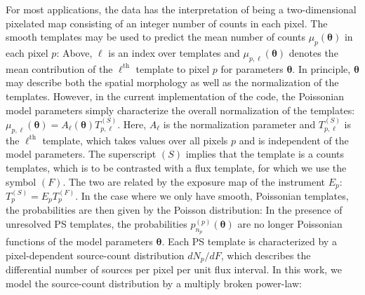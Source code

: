 For most applications, the data has the interpretation of being a two-dimensional pixelated map consisting of an integer number of counts in each pixel.  The smooth templates may be used to predict the mean number of counts $\mu_p({\bm \theta})$ in each pixel $p$:   
Above, $\ell$ is an index over templates and $\mu_{p, \ell} ({\bm \theta})$ denotes the mean contribution of the $\ell^\text{th}$ template to pixel $p$ for parameters ${\bm \theta}$.  In principle, ${\bm \theta}$ may describe both the spatial morphology as well as the normalization of the templates.  However, in the current implementation of the code, the Poissonian model parameters simply characterize the overall normalization of the templates: $\mu_{p, \ell} ({\bm \theta}) = A_{\ell}( {\bm \theta}) T^{(S)}_{p,\ell}$.  Here, $A_{\ell}$ is the normalization parameter and $T^{(S)}_{p,\ell}$ is the $\ell^\text{th}$ template, which takes values over all pixels $p$ and is independent of the model parameters.  The superscript $(S)$ implies that the template is a counts templates, which is to be contrasted with a flux template, for which we use the symbol $(F)$. The two are related by the exposure map of the instrument $E_{p}$: $T^{(S)}_p = E_p T^{(F)}_p$. In the case where we only have smooth, Poissonian templates, the probabilities are then given by the Poisson distribution:
In the presence of unresolved PS templates, the probabilities $p_{n_p}^{(p)}({\bm \theta})$ are no longer Poissonian functions of the model parameters ${\bm \theta}$.  Each PS template is characterized by a pixel-dependent source-count distribution $dN_p/dF$, which describes the differential number of sources per pixel per unit flux interval.  In this work, we model the source-count distribution by a multiply broken power-law:  
